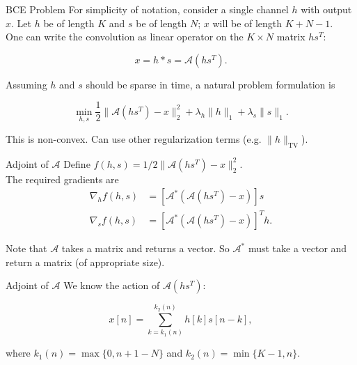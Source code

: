 \documentclass[xcolor=dvipsnames,t]{beamer} %
\begin{document}
\begin{frame}{BCE Problem}
   For simplicity of notation, consider a single channel $h$ with output $x$.  Let $h$ be of length $K$ and $s$ be of length $N$; $x$ will be of length $K+N-1$.\\[0.5em]

   One can write the convolution as linear operator on the $K\times N$ matrix $hs^T$:

   \[ x = h\ast s = \mathcal{A}(hs^T). \] 

   \noindent Assuming $h$ and $s$ should be sparse in time, a natural problem formulation is
      
   \[ \min_{h,s} \dfrac{1}{2}\|\mathcal{A}(hs^T)-x\|_2^2 + \lambda_h\|h\|_1 + \lambda_s\|s\|_1. \] 

   \noindent This is non-convex.  Can use other regularization terms (e.g. $\|h\|_\text{TV}$).
\end{frame}

\begin{frame}{Adjoint of $\mathcal{A}$}
   Define $f(h,s) = 1/2\|\mathcal{A}(hs^T)-x\|_2^2$.\\[.5em]
   
   The required gradients are
   \begin{align*}
      \nabla_h f(h,s) &= \left[\mathcal{A}^\ast(\mathcal{A}(hs^T)-x)\right]s\\
      \nabla_s f(h,s) &= \left[\mathcal{A}^\ast(\mathcal{A}(hs^T)-x)\right]^Th.
   \end{align*}

   Note that $\mathcal{A}$ takes a matrix and returns a vector.  So $\mathcal{A}^\ast$ must take a vector and return a matrix (of appropriate size).\\

\end{frame}

\begin{frame}{Adjoint of $\mathcal{A}$}
   We know the action of $\mathcal{A}(hs^T)$:
      
   \[ x[n] =  \sum_{k=k_1(n)}^{k_2(n)} h[k]s[n-k], \] 

   where $k_1(n) = \max\{0,n+1-N\}$ and $k_2(n) = \min\{K-1,n\}$.

\end{frame}
\end{document}

